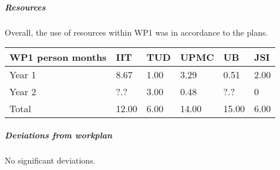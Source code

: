 

\subparagraph{Resources}
Overall, the use of resources within WP1 was in accordance to the plans. 

\begin{center}
  \begin{tabular}{|C{1.5cm}|C{1.5cm}|C{1.5cm}|C{2cm}|C{2cm}|C{2cm}|}
    \hline \footnotesize \textbf{WP1 person months}& \footnotesize
    \textbf{IIT}&\footnotesize \textbf{TUD}&\footnotesize \textbf{UPMC}&
    \footnotesize \textbf{UB} &\footnotesize \textbf{JSI}\\
    \hline \footnotesize Year 1 & 8.67 &1.00 & 3.29 & 0.51 & 2.00 \\
    \hline \footnotesize Year 2 & ?.? &3.00 & 0.48 & ?.? & 0 \\
    \hline \footnotesize Total & 12.00 & 6.00 & 14.00 & 15.00 & 6.00 \\
    \hline
  \end{tabular}
\end{center}

\subparagraph{Deviations from workplan} 
No significant deviations. 

